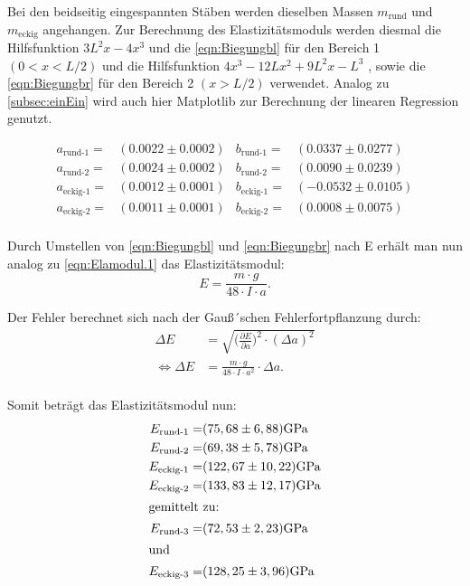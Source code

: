 Bei den beidseitig eingespannten Stäben werden dieselben Massen $m_{\text{rund}}$ und $m_{\text{eckig}}$ angehangen.
Zur Berechnung des Elastizitätsmoduls werden diesmal die Hilfsfunktion $3L^2x - 4x^3$ und die \autoref{eqn:Biegungbl} für den Bereich 1 $(0<x<L/2)$ und die Hilfsfunktion $4x^3-12Lx^2+9L^2x-L^3$ , sowie die \autoref{eqn:Biegungbr} für den Bereich 2 $(x>L/2)$
verwendet. Analog zu \autoref{subsec:einEin} wird auch hier Matplotlib zur Berechnung der linearen Regression genutzt.

\begin{align*}
  a_{\text{rund-1}} =&(0.0022 ± 0.0002) & b_{\text{rund-1}}=& (0.0337 ± 0.0277)\\
  a_{\text{rund-2}} =&(0.0024 ± 0.0002) & b_{\text{rund-2}}=& (0.0090 ± 0.0239)\\
  a_{\text{eckig-1}} =&(0.0012 ± 0.0001) & b_{\text{eckig-1}}=& (-0.0532 ± 0.0105)\\
  a_{\text{eckig-2}} =&(0.0011 ± 0.0001) & b_{\text{eckig-2}}=& (0.0008 ± 0.0075)\\
 \end{align*}

 Durch Umstellen von \autoref{eqn:Biegungbl} und \autoref{eqn:Biegungbr} nach E erhält man nun analog zu \autoref{eqn:Elamodul.1} das Elastizitätsmodul:
 \begin{equation*}
  E = \frac{m\cdot g}{48\cdot I \cdot a}.
  \label{eqn:e-ein}
  \end{equation*}

Der Fehler berechnet sich nach der Gauß´schen Fehlerfortpflanzung durch:
\begin{equation*}
  \begin{aligned}
  \Delta E &= \sqrt{\biggl(\frac{\partial E}{\partial a}\biggr)^2\cdot (\Delta a)^2} \\
  \iff \Delta E &= \frac{m\cdot g}{48\cdot I \cdot a^2} \cdot \Delta a.\\
  \label{eqn:e-fehler-beid}
  \end{aligned}
  \end{equation*}

Somit beträgt das Elastizitätsmodul nun:
\begin{align*}
  E_{\text{rund-1}}=&(75,68\pm6,88)\si{\giga\pascal}\\
  E_{\text{rund-2}}=&(69,38\pm5,78)\si{\giga\pascal}\\
  E_{\text{eckig-1}}=&(122,67\pm10,22)\si{\giga\pascal}\\
  E_{\text{eckig-2}}=&(133,83\pm12,17)\si{\giga\pascal}\\
  \intertext{gemittelt zu:}
  E_{\text{rund-3}}=&(72,53\pm2,23)\si{\giga\pascal}\\
  \intertext{und}
  E_{\text{eckig-3}}=&(128,25\pm3,96)\si{\giga\pascal}\\
  \label{eqn:Ebeid} 
\end{align*}

\pagebreak



